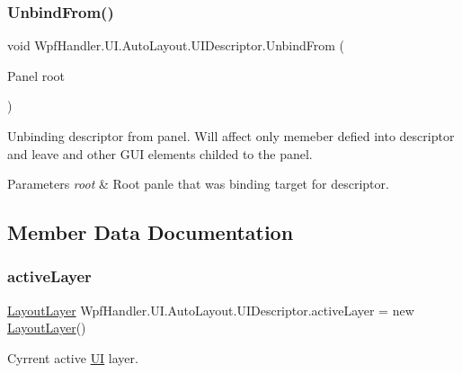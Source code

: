 \subsubsection{\texorpdfstring{Unbind\+From()}{UnbindFrom()}}
{\footnotesize\ttfamily void Wpf\+Handler.\+U\+I.\+Auto\+Layout.\+U\+I\+Descriptor.\+Unbind\+From (\begin{DoxyParamCaption}\item[{Panel}]{root }\end{DoxyParamCaption})}



Unbinding descriptor from panel. Will affect only memeber defied into descriptor and leave and other G\+UI elements childed to the panel. 


\begin{DoxyParams}{Parameters}
{\em root} & Root panle that was binding target for descriptor.\\
\hline
\end{DoxyParams}


\subsection{Member Data Documentation}
\mbox{\label{class_wpf_handler_1_1_u_i_1_1_auto_layout_1_1_u_i_descriptor_a5870ffc200ecb9f352cb250b497b3df2}} 
\subsubsection{\texorpdfstring{active\+Layer}{activeLayer}}
{\footnotesize\ttfamily \mbox{\hyperlink{class_wpf_handler_1_1_u_i_1_1_auto_layout_1_1_layout_layer}{Layout\+Layer}} Wpf\+Handler.\+U\+I.\+Auto\+Layout.\+U\+I\+Descriptor.\+active\+Layer = new \mbox{\hyperlink{class_wpf_handler_1_1_u_i_1_1_auto_layout_1_1_layout_layer}{Layout\+Layer}}()\hspace{0.3cm}{\ttfamily [private]}}



Cyrrent active \mbox{\hyperlink{namespace_wpf_handler_1_1_u_i}{UI}} layer. 



